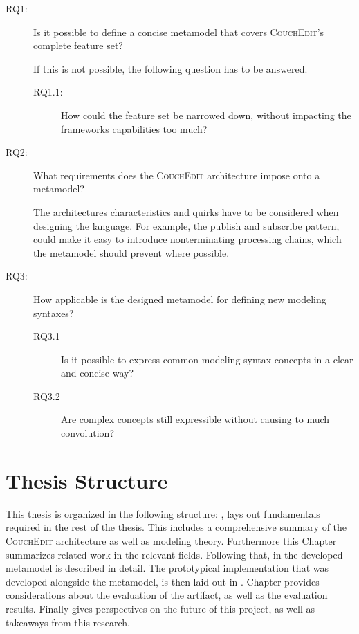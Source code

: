 \begin{description} 
  \item[RQ1:]  Is it possible to define a concise metamodel that covers \textsc{CouchEdit}'s complete feature set?

        If this is not possible, the following question has to be answered.
        \begin{description}
          \item[RQ1.1:] How could the feature set be narrowed down, without impacting the frameworks capabilities too much?
        \end{description}

  \item[RQ2:] What requirements does the \textsc{CouchEdit} architecture impose onto a metamodel?

        The architectures characteristics and quirks have to be considered when designing the language. For example, the publish and subscribe pattern, could make it easy to introduce nonterminating processing chains, which the metamodel should prevent where possible.

  \item[RQ3:] How applicable is the designed metamodel for defining new modeling syntaxes?

        \begin{description}
          \item[RQ3.1] Is it possible to express common modeling syntax concepts in a clear and concise way?
          \item[RQ3.2] Are complex concepts still expressible without causing to much convolution?
        \end{description}
\end{description}



\section{Thesis Structure}
This thesis is organized in the following structure: , lays out fundamentals required in the rest of the thesis. This includes a comprehensive summary of the \textsc{CouchEdit} architecture as well as modeling theory. Furthermore this Chapter summarizes related work in the relevant fields. Following that, in  the developed metamodel is described in detail. The prototypical implementation that was developed alongside the metamodel, is then laid out in . Chapter  provides considerations about the evaluation of the artifact, as well as the evaluation results. Finally  gives perspectives on the future of this project, as well as takeaways from this research.